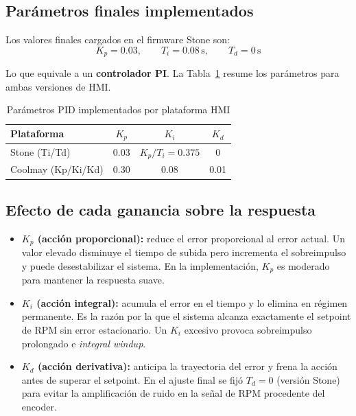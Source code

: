 \documentclass[journal, onecolumn]{IEEEtran}
\begin{document}
\subsection{Parámetros finales implementados}

Los valores finales cargados en el firmware Stone son:
\[
  K_p = 0.03, \qquad T_i = 0.08\,\text{s}, \qquad T_d = 0\,\text{s}
\]

Lo que equivale a un \textbf{controlador PI}. La Tabla~\ref{tab:pid_params}
resume los parámetros para ambas versiones de HMI.

\begin{table}[H]
  \centering
  \caption{Parámetros PID implementados por plataforma HMI}
  \label{tab:pid_params}
  \begin{tabular}{lccc}
    \toprule
    \textbf{Plataforma} & $K_p$ & $K_i$ & $K_d$ \\
    \midrule
    Stone (Ti/Td)   & 0.03 & $K_p/T_i = 0.375$ & 0 \\
    Coolmay (Kp/Ki/Kd) & 0.30 & 0.08 & 0.01 \\
    \bottomrule
  \end{tabular}
\end{table}

\subsection{Efecto de cada ganancia sobre la respuesta}

\begin{itemize}
  \item \textbf{$K_p$ (acción proporcional):} reduce el error proporcional al
        error actual. Un valor elevado disminuye el tiempo de subida pero
        incrementa el sobreimpulso y puede desestabilizar el sistema. En la
        implementación, $K_p$ es moderado para mantener la respuesta suave.

  \item \textbf{$K_i$ (acción integral):} acumula el error en el tiempo y lo
        elimina en régimen permanente. Es la razón por la que el sistema
        alcanza exactamente el setpoint de RPM sin error estacionario. Un $K_i$
        excesivo provoca sobreimpulso prolongado e \textit{integral windup}.

  \item \textbf{$K_d$ (acción derivativa):} anticipa la trayectoria del error
        y frena la acción antes de superar el setpoint. En el ajuste final se
        fijó $T_d = 0$ (versión Stone) para evitar la amplificación de ruido
        en la señal de RPM procedente del encoder.
\end{itemize}
\end{document}
